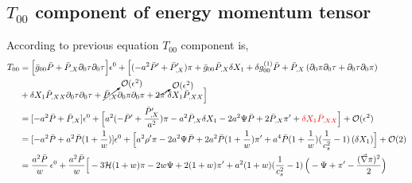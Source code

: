 \documentclass[a4paper,11pt]{article}
\begin{document}
\subsection{$T_{00}$ component of energy momentum tensor}
According to previous equation $T_{00} $ component is,
\begin{align} \label{T00}
T_{00} &=
   \Big[ \bar{g}_{0 0} \bar{P} 
+
 \bar{P}_{,X} \partial_{0} \tau \partial_{0} \tau \Big] \epsilon ^0 
+
\Big[( -a^2 \bar{P}' +\bar{P}'_{,X} )\pi+\bar{g}_{0 0}  \bar{P}_{,X} \delta X_1 
+
 \delta g^{(1)}_{0 0} \bar{P} 
 +
  \bar{P}_{,X}  \left ( \partial_{0} \pi \partial_{0} \tau  
  +
  \partial_{0} \tau \partial_{0} \pi  \right ) 
    \nonumber
 \\
  &
  +
   \delta X_1 \bar{P}_{,XX}   \partial_{0} \tau \partial_{0} \tau 
   +
    \cancelto{\mathcal {O}(\epsilon^{2}) 
} { \bar{P}_{,X}  } \partial_{0} \pi \partial_{0} \pi  +   \cancelto{\mathcal {O}(\epsilon^{2})}  {2 \pi'   } \delta X_1  \bar{P}_{,XX}  \Big ]
  \nonumber
 \\
  &
  =
  [-a^2  \bar{P} 
+
 \bar{P}_{,X}  ] \epsilon ^0 
+
\Big[a^2 (- \bar{P}' +\frac{\bar{P}'_{,X}}{a^2} )\pi- a^2 \bar{P}_{,X} \delta X_1 
-
 2 a^2 \Psi \bar{P} 
 +
 2 \bar{P}_{,X}   {\pi'}
  +
    {\color{red}
   \delta X_1 \bar{P}_{,XX} }
  \Big ] 
+ \mathcal {O}(\epsilon^{2}) 
  \nonumber
 \\
  &
  =
  [-a^2 \bar{P} 
+
a^2 \bar{P}  (1+\frac{1}{w}) ] \epsilon ^0 
+
\Big[a^2 \rho' \pi
-
 2 a^2  \Psi \bar{P} 
 +
 2  a^2 \bar{P}  (1+\frac{1}{w})  {\pi'}
  +
  a^4 \bar{P}  (1+\frac{1}{w}) (\frac{1}{c_s^2}-1) \,   (\delta X_1 )
   \Big ] 
+ \mathcal {O}(2) 
  \nonumber
 \\
  &
  =
 \frac{ a^2 \bar{P}}{w} \,\epsilon ^0 
+
\frac{ a^2\bar{ P}}{w}   \Big[ -3 \mathcal{H} (1+w) \pi
-
 2   w \Psi
 +
 2  (1+w)  {\pi'}
  +
  a^2 (1+w) (\frac{1}{c_s^2}-1) \, \Big(  -\Psi+{\pi'}-  \frac{(\vec{\nabla} \pi)^2}{2} \Big)

\end{align}
\end{document}
